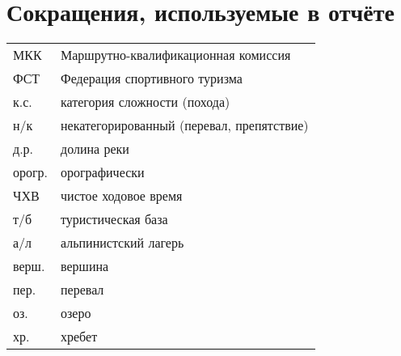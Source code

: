 \section*{Сокращения, используемые в отчёте}
\begin{tabular}{p{} p{}}
	МКК                                  &   Маршрутно-квалификационная комиссия  \\
	ФСТ                                &   Федерация спортивного туризма  \\
	к.с.                               &   категория сложности (похода)  \\
	н/к                            &   некатегорированный (перевал, препятствие) \\
	д.р.                            &   долина реки \\
	орогр.                &   орографически  \\
	ЧХВ                          &   чистое ходовое время  \\
	т/б                         &   туристическая база \\
	а/л                  &   альпинистский лагерь \\
	верш.               &   вершина \\
	пер.               &   перевал \\
	оз.             &   озеро \\
	хр. &   хребет \\
	
\end{tabular}